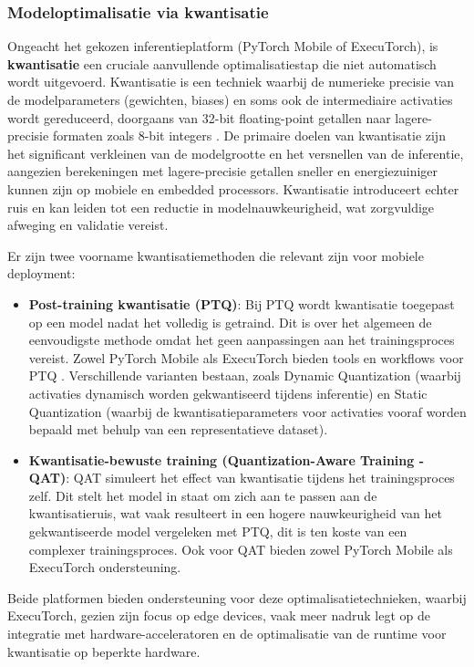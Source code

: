 \subsubsection{Modeloptimalisatie via kwantisatie}
\label{sssec:model-optimalisatie-kwantisatie}

Ongeacht het gekozen inferentieplatform (PyTorch Mobile of ExecuTorch), is \textbf{kwantisatie} een cruciale aanvullende optimalisatiestap die niet automatisch wordt uitgevoerd.
Kwantisatie is een techniek waarbij de numerieke precisie van de modelparameters (gewichten, biases) en soms ook de intermediaire activaties wordt gereduceerd, doorgaans van 32-bit floating-point getallen naar lagere-precisie formaten zoals 8-bit integers \autocite{quantization_survey}.
De primaire doelen van kwantisatie zijn het significant verkleinen van de modelgrootte en het versnellen van de inferentie, aangezien berekeningen met lagere-precisie getallen sneller en energiezuiniger kunnen zijn op mobiele en embedded processors.
Kwantisatie introduceert echter ruis en kan leiden tot een reductie in modelnauwkeurigheid, wat zorgvuldige afweging en validatie vereist.

Er zijn twee voorname kwantisatiemethoden die relevant zijn voor mobiele deployment:
\begin{itemize}
    \item \textbf{Post-training kwantisatie (PTQ)}: Bij PTQ wordt kwantisatie toegepast op een model nadat het volledig is getraind.
Dit is over het algemeen de eenvoudigste methode omdat het geen aanpassingen aan het trainingsproces vereist.
Zowel PyTorch Mobile als ExecuTorch bieden tools en workflows voor PTQ \autocite{krishnamoorthi2018quantization}.
Verschillende varianten bestaan, zoals Dynamic Quantization (waarbij activaties dynamisch worden gekwantiseerd tijdens inferentie) en Static Quantization (waarbij de kwantisatieparameters voor activaties vooraf worden bepaald met behulp van een representatieve dataset).
    \item \textbf{Kwantisatie-bewuste training (Quantization-Aware Training - QAT)}: QAT simuleert het effect van kwantisatie tijdens het trainingsproces zelf.
Dit stelt het model in staat om zich aan te passen aan de kwantisatieruis, wat vaak resulteert in een hogere nauwkeurigheid van het gekwantiseerde model vergeleken met PTQ, dit is ten koste van een complexer trainingsproces.
Ook voor QAT bieden zowel PyTorch Mobile als ExecuTorch ondersteuning.
\end{itemize}
Beide platformen bieden ondersteuning voor deze optimalisatietechnieken, waarbij ExecuTorch, gezien zijn focus op edge devices, vaak meer nadruk legt op de integratie met hardware-acceleratoren en de optimalisatie van de runtime voor kwantisatie op beperkte hardware.

